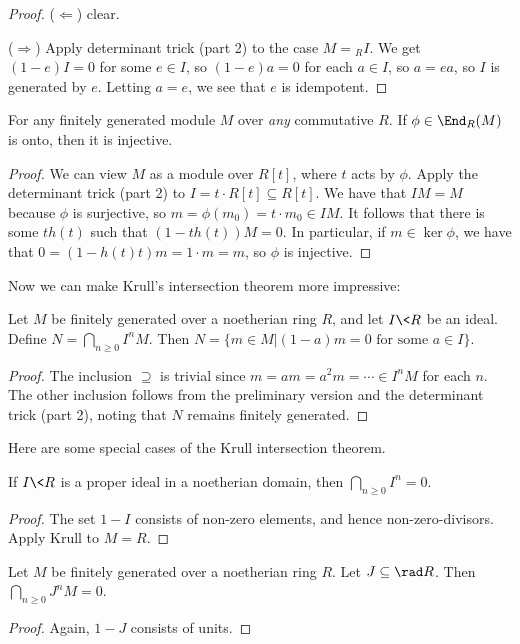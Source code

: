  \begin{proof}
   ($\Leftarrow$) clear.

   ($\Rightarrow$) Apply determinant trick (part 2) to the case $M={}_R I$. We get
   $(1-e)I=0$ for some $e\in I$, so $(1-e)a=0$ for each $a\in I$, so $a=ea$, so $I$ is
   generated by $e$. Letting $a=e$, we see that $e$ is idempotent.
 \end{proof}
 \begin{corollary}
   For any finitely generated module $M$ over \emph{any} commutative $R$. If $\phi\in
   \End_R(M)$ is onto, then it is injective.
 \end{corollary}
 \begin{proof}
   We can view $M$ as a module over $R[t]$, where $t$ acts by $\phi$. Apply the
   determinant trick (part 2) to $I=t\cdot R[t]\subseteq R[t]$. We have that $IM=M$
   because $\phi$ is surjective, so $m =\phi(m_0)=t\cdot m_0\in IM$. It follows that
   there is some $th(t)$ such that $(1-th(t))M=0$. In particular, if $m\in  \ker \phi$,
   we have that $0=(1-h(t)t)m=1\cdot m=m$, so $\phi$ is injective.
 \end{proof}
 Now we can make Krull's intersection theorem more impressive:
 \begin{theorem}
   Let $M$ be finitely generated over a noetherian ring $R$, and let $I\< R$ be an ideal.
   Define $N = \bigcap_{n\ge 0} I^nM$. Then $N=\{m\in M|(1-a)m=0\text{ for some } a\in
   I\}$.
 \end{theorem}
 \begin{proof}
   The inclusion $\supseteq$ is trivial since $m=am=a^2m=\cdots \in I^nM$ for each $n$.
   The other inclusion follows from the preliminary version and the determinant trick
   (part 2), noting that $N$ remains finitely generated.
 \end{proof}
 Here are some special cases of the Krull intersection theorem.
 \begin{corollary}
   If $I\< R$ is a proper ideal in a noetherian domain, then $\bigcap_{n\ge 0} I^n=0$.
 \end{corollary}
 \begin{proof}
   The set $1-I$ consists of non-zero elements, and hence non-zero-divisors. Apply Krull
   to $M=R$.
 \end{proof}
 \begin{corollary}
   Let $M$ be finitely generated over a noetherian ring $R$. Let $J\subseteq \rad R$.
   Then $\bigcap_{n\ge 0} J^nM=0$.
 \end{corollary}
 \begin{proof}
   Again, $1-J$ consists of units.
 \end{proof}
 \setcounter{lecture}{16}

